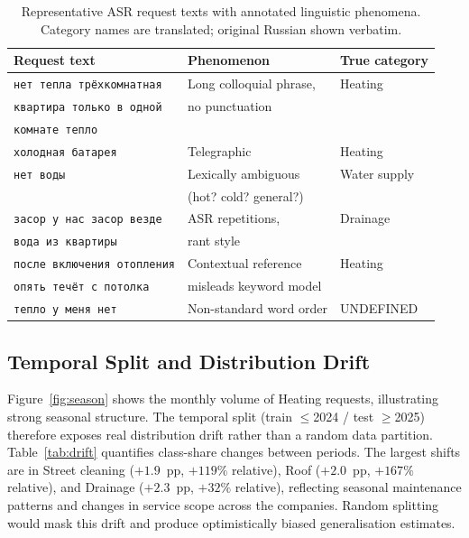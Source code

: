 \documentclass[11pt]{article}
\begin{document}
\begin{table}[h]\centering
\small
\caption{Representative ASR request texts with annotated linguistic
phenomena. Category names are translated; original Russian shown verbatim.}
\label{tab:asr}
\begin{tabular}{p{5.4cm}p{2.5cm}p{2.5cm}}
\toprule
Request text & Phenomenon & True category \\
\midrule
\texttt{нет тепла трёхкомнатная} &
  Long colloquial phrase, & Heating \\
\texttt{квартира только в одной} &
  no punctuation & \\
\texttt{комнате тепло} & & \\
\midrule
\texttt{холодная батарея} & Telegraphic & Heating \\
\midrule
\texttt{нет воды} & Lexically ambiguous & Water supply \\
  & (hot? cold? general?) & \\
\midrule
\texttt{засор у нас засор везде} &
  ASR repetitions, & Drainage \\
\texttt{вода из квартиры} &
  rant style & \\
\midrule
\texttt{после включения отопления} &
  Contextual reference & Heating \\
\texttt{опять течёт с потолка} &
  misleads keyword model & \\
\midrule
\texttt{тепло у меня нет} &
  Non-standard word order & UNDEFINED \\
\bottomrule
\end{tabular}
\end{table}

\subsection{Temporal Split and Distribution Drift}

Figure~\ref{fig:season} shows the monthly volume of Heating requests,
illustrating strong seasonal structure. The temporal split (train $\leq$2024
/ test $\geq$2025) therefore exposes real distribution drift rather than a
random data partition. Table~\ref{tab:drift} quantifies class-share changes
between periods. The largest shifts are in Street cleaning ($+1.9$~pp,
$+119\%$ relative), Roof ($+2.0$~pp, $+167\%$ relative), and Drainage
($+2.3$~pp, $+32\%$ relative), reflecting seasonal maintenance patterns and
changes in service scope across the companies. Random splitting would mask
this drift and produce optimistically biased generalisation estimates.
\end{document}

